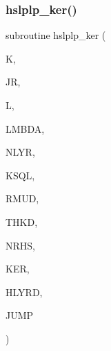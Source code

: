 \subsubsection{\texorpdfstring{hslplp\+\_\+ker()}{hslplp\_ker()}}
{\footnotesize\ttfamily subroutine hslplp\+\_\+ker (\begin{DoxyParamCaption}\item[{integer}]{K,  }\item[{integer}]{JR,  }\item[{integer}]{L,  }\item[{real(kind=ql)}]{L\+M\+B\+DA,  }\item[{integer}]{N\+L\+YR,  }\item[{complex(kind=ql), dimension (nlyr)}]{K\+S\+QL,  }\item[{real(kind=ql), dimension(0\+:nlyr)}]{R\+M\+UD,  }\item[{real(kind=ql), dimension(nlyr)}]{T\+H\+KD,  }\item[{integer}]{N\+R\+HS,  }\item[{complex(kind=ql), dimension(jnlo-\/nrhs\+:jnhi)}]{K\+ER,  }\item[{complex(kind=ql), dimension(nrhs)}]{H\+L\+Y\+RD,  }\item[{logical}]{J\+U\+MP }\end{DoxyParamCaption})}

\mbox{\label{Leroi__c_8f90_a48d6fa7ecaca60caaf9ecba957eaa3b1}} 
